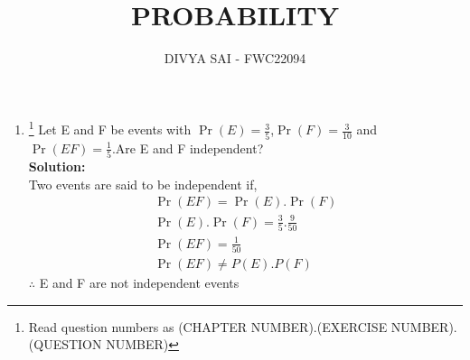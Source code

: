 \documentclass{article}
\providecommand{\pr}[1]{\ensuremath{\Pr\left(#1\right)}}
\newcommand{\solution}{\noindent \textbf{Solution: }}
\begin{document}
\title{PROBABILITY}
\author{\Large DIVYA SAI - FWC22094}
\date{}

\maketitle
\begin{enumerate}[label=13.\arabic{enumi}.\arabic{enumii}]%
\setcounter{enumi}{1}
\setcounter{enumii}{6}

\item \footnote{Read question numbers as (CHAPTER NUMBER).(EXERCISE NUMBER).(QUESTION NUMBER)} { Let E and F be events with $\pr{E}=\frac{3}{5}$,$\pr{F}=\frac{3}{10}$ and $\pr{E F}=\frac{1}{5}$.Are E and F independent?}\\[1ex]
\solution
\\
Two events are said to be independent if,
\begin{align}
\pr{E F}=\pr{E}.\pr{F}
\\
\pr{E}.\pr{F}=\frac{3}{5}.\frac{9}{50}
\\
\pr{E F}=\frac{1}{50}
\\
\pr{E F} \neq P(E).P(F)
\end{align}
$\therefore$ E and F are not independent events
\end{enumerate}
\end{document}
